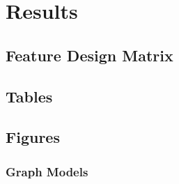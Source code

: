 \section{Results}

\subsection{Feature Design Matrix}

\subsection{Tables}

\subsection{Figures}

\subsubsection{Graph Models}



\begin{thebibliography}{00}

\end{thebibliography}


